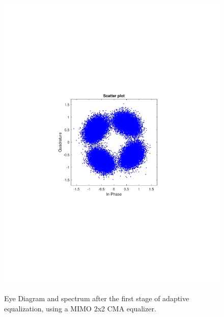 \begin{refsection}
\begin{figure}[H]
\begin{minipage}{0.30\textwidth}
		\includegraphics[clip, trim=4cm 8cm 4cm 8cm, width=1\textwidth]{./sdf/m_qam_system/figures/expResults/homodyne/3_const_4GBdInSig13dB_AfMIMO1.pdf}
		\label{fig:4GBdSpecBefFec}
	\end{minipage}
	\caption{Eye Diagram and spectrum after the first stage of adaptive equalization, using a MIMO 2x2 CMA equalizer.}
\end{figure}



\end{refsection}
